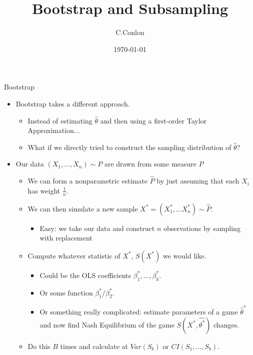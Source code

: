 

\title [Bootstrap]{Bootstrap and Subsampling}
\author{C.Conlon}
\date{\today}


\begin{frame}
\titlepage
\end{frame}

\begin{frame}{Bootstrap}
\begin{itemize}
\item Bootstrap takes a different approach.
\begin{itemize}
\item Instead of estimating $\hat{\theta}$ and then using a first-order Taylor Approximation...
\item What if we directly tried to construct the \alert{sampling distribution} of $\hat{\theta}$?
\end{itemize}
\item Our data $(X_1,\ldots,X_n) \sim P$ are drawn from some measure $P$
\begin{itemize}
\item We can form a \alert{nonparametric estimate} $\hat{P}$ by just assuming that each $X_i$ has weight $\frac{1}{n}$.
\item We can then simulate a new sample $X^{*} = (X_1^{*},\ldots X_n^{*}) \sim \hat{P}$.
\begin{itemize}
\item Easy: we take our data and construct $n$ observations by \alert{sampling with replacement} 
\end{itemize}
\item Compute whatever statistic of $X^{*}$, $S(X^*)$ we would like.
\begin{itemize}
\item Could be the OLS coefficients $\beta_1^{*},\ldots, \beta_k^{*}$.
\item Or some function $\beta_1^{*}/\beta_2^{*}$.
\item Or something really complicated: estimate parameters of a game $\hat{\theta}^*$ and now find Nash Equilibrium of the game $S(X^{*},\hat{\theta^*})$ changes.
\end{itemize}
\item Do this $B$ times and calculate at $Var(S_b)$ or $CI(S_1,\ldots, S_b)$.
\end{itemize}
\end{itemize}
\end{frame}


